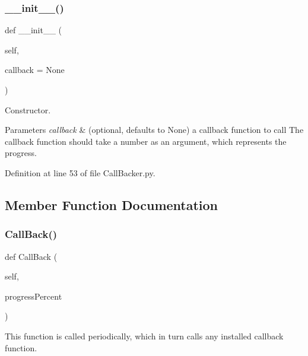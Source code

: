 \subsubsection{\texorpdfstring{\+\_\+\+\_\+init\+\_\+\+\_\+()}{\_\_init\_\_()}}
{\footnotesize\ttfamily def \+\_\+\+\_\+init\+\_\+\+\_\+ (\begin{DoxyParamCaption}\item[{}]{self,  }\item[{}]{callback = {\ttfamily None} }\end{DoxyParamCaption})}



Constructor. 


\begin{DoxyParams}{Parameters}
{\em callback} & (optional, defaults to None) a callback function to call The callback function should take a number as an argument, which represents the progress. \\
\hline
\end{DoxyParams}


Definition at line 53 of file Call\+Backer.\+py.



\subsection{Member Function Documentation}
\mbox{\label{classSignalIntegrity_1_1CallBacker_1_1CallBacker_ad1aebee41f7b067b9fc11c28f87b27ba}} 
\subsubsection{\texorpdfstring{Call\+Back()}{CallBack()}}
{\footnotesize\ttfamily def Call\+Back (\begin{DoxyParamCaption}\item[{}]{self,  }\item[{}]{progress\+Percent }\end{DoxyParamCaption})}



This function is called periodically, which in turn calls any installed callback function. 



